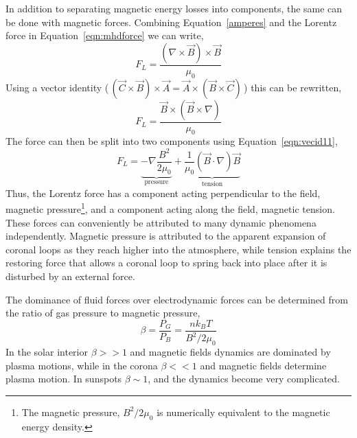 In addition to separating magnetic energy losses into components, the same can be done with magnetic forces. Combining Equation~\ref{amperes} and the Lorentz force in Equation~\ref{eqn:mhdforce} we can write, 
\begin{equation}
F_L = \frac{(\nabla\times\vec{B})\times\vec{B}}{\mu_0}  
\end{equation}
Using a vector identity (\,$(\vec{C}\times \vec{B})\times \vec{A} = \vec{A}\times (\vec{B}\times \vec{C})$\,) this can be rewritten,
\begin{equation}
F_L = \frac{\vec{B}\times(\vec{B}\times\nabla)}{\mu_0}  
\end{equation}
The force can then be split into two components using Equation~\ref{eqn:vecid11},
\begin{equation}
F_L = \underbrace{-\nabla \frac{B^2}{2\mu_0}}_{\mathrm{pressure}} + \underbrace{\frac{1}{\mu_0}(\vec{B}\cdot\nabla)\vec{B}}_{\mathrm{tension}}  
\end{equation}
Thus, the Lorentz force has a component acting perpendicular to the field, magnetic pressure\footnote{The magnetic pressure, $B^2/2\mu_0$ is numerically equivalent to the magnetic energy density.}, and a component acting along the field, magnetic tension. These forces can conveniently be attributed to many dynamic phenomena independently. Magnetic pressure is attributed to the apparent expansion of coronal loops as they reach higher into the atmosphere, while tension explains the restoring force that allows a coronal loop to spring back into place after it is disturbed by an external force. 

The dominance of fluid forces over electrodynamic forces can be determined from the ratio of gas pressure to magnetic pressure,
\begin{equation}\label{eqn:plasmabeta}
\beta = \frac{P_G}{P_B} = \frac{n k_B T}{B^2/2\mu_0}  
\end{equation}
In the solar interior $\beta>>1$ and magnetic fields dynamics are dominated by plasma motions, while in the corona $\beta<<1$ and magnetic fields determine plasma motion. In sunspots $\beta\sim1$, and the dynamics become very complicated.

